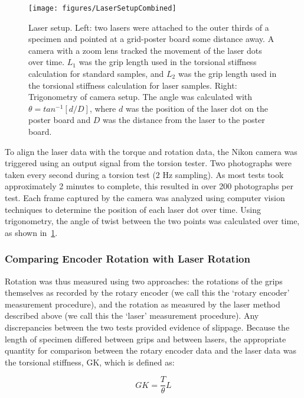 \begin{figure}[htbp]
	\centering
	\texttt{[image: figures/LaserSetupCombined]}
	\caption[Laser setup.]{Laser setup. Left: two lasers were attached to the outer thirds of a specimen and pointed at a grid-poster board some distance away. A camera with a zoom lens tracked the movement of the laser dots over time. ${L_{1}}$ was the grip length used in the torsional stiffness calculation for standard samples, and ${L_{2}}$ was the grip length used in the torsional stiffness calculation for laser samples.  Right: Trigonometry of camera setup. The angle  was calculated with ${\theta = tan^{-1}[d/D]}$, where ${d}$ was the position of the laser dot on the poster board and ${D}$ was the distance from the laser to the poster board.}
	\label{fig:LaserSetupCombined}
\end{figure}

To align the laser data with the torque and rotation data, the Nikon camera was triggered using an output signal from the torsion tester. Two photographs were taken every second during a torsion test (2 Hz sampling). As most tests took approximately 2 minutes to complete, this resulted in over 200 photographs per test. Each frame captured by the camera was analyzed using computer vision techniques to determine the position of each laser dot over time. Using trigonometry, the angle of twist between the two points was calculated over time, as shown in~\cref{fig:LaserSetupCombined}. 

\subsubsection{Comparing Encoder Rotation with Laser Rotation}
\label{ssec:comparing_encoder_rotation_with_laser_rotation}
Rotation was thus measured using two approaches: the rotations of the grips themselves as recorded by the rotary encoder (we call this the ‘rotary encoder’ measurement procedure), and the rotation as measured by the laser method described above (we call this the ‘laser’ measurement procedure). Any discrepancies between the two tests provided evidence of slippage. Because the length of specimen differed between grips and between lasers, the appropriate quantity for comparison between the rotary encoder data and the laser data was the torsional stiffness, GK, which is defined as: 

\begin{equation}
	\label{eq:torsional_stiffness}
	GK = \frac{T}{\theta} L
\end{equation}

